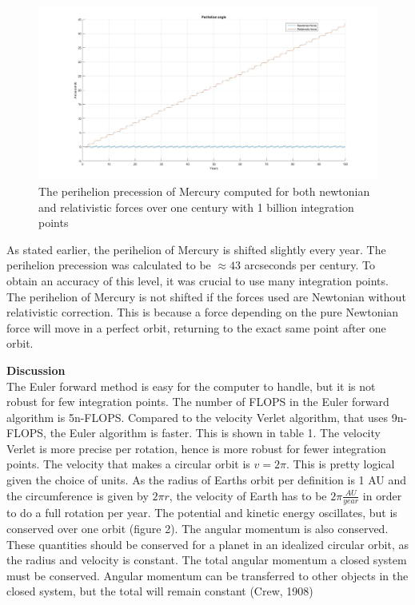 \documentclass[10pt,a4paper]{article}
\begin{document}
\begin{figure} [H]
\centerline{\includegraphics[scale=0.3]{perihelion.jpg}}
\caption{The perihelion precession of Mercury computed for both newtonian and relativistic forces over one century with 1 billion integration points}
\end{figure} 
\noindent As stated earlier, the perihelion of Mercury is shifted slightly every year. The perihelion precession was calculated to be $\approx 43$ arcseconds per century. To obtain an accuracy of this level, it was crucial to use many integration points. The perihelion of Mercury is not shifted if the forces used are Newtonian without relativistic correction. This is because a force depending on the pure Newtonian force will move in a perfect orbit, returning to the exact same point after one orbit. 


\newpage
{\LARGE\bf
Discussion
}
\\


\noindent The Euler forward method is easy for the computer to handle, but it is not robust for few integration points. The number of FLOPS in the Euler forward algorithm is 5n-FLOPS. Compared to the velocity Verlet algorithm, that uses 9n-FLOPS, the Euler algorithm is faster. This is shown in table 1. The velocity Verlet is more precise per rotation, hence is more robust for fewer integration points. The velocity that makes a circular orbit is $v=2\pi$. This is pretty logical given the choice of units. As the radius of Earths orbit per definition is 1 AU and the circumference is given by $2\pi r$, the velocity of Earth has to be $2\pi \frac{AU}{year}$ in order to do a full rotation per year. The potential and kinetic energy oscillates, but is conserved over one orbit (figure 2). The angular momentum is also conserved. These quantities should be conserved for a planet in an idealized circular orbit, as the radius and velocity is constant. The total angular momentum a closed system must be conserved. Angular momentum can be transferred to other objects in the closed system, but the total will remain constant (Crew, 1908) \\
\end{document}
